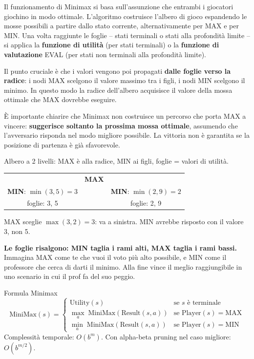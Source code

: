 \documentclass[12pt,a4paper]{article}
\begin{document}
Il funzionamento di Minimax si basa sull'assunzione che entrambi i giocatori giochino in modo ottimale. L'algoritmo costruisce l'albero di gioco espandendo le mosse possibili a partire dallo stato corrente, alternativamente per MAX e per MIN. Una volta raggiunte le foglie -- stati terminali o stati alla profondità limite -- si applica la \textbf{funzione di utilità} (per stati terminali) o la \textbf{funzione di valutazione} EVAL (per stati non terminali alla profondità limite).

Il punto cruciale è che i valori vengono poi propagati \textbf{dalle foglie verso la radice}: i nodi MAX scelgono il valore massimo tra i figli, i nodi MIN scelgono il minimo. In questo modo la radice dell'albero acquisisce il valore della mossa ottimale che MAX dovrebbe eseguire.

È importante chiarire che Minimax non costruisce un percorso che porta MAX a vincere: \textbf{suggerisce soltanto la prossima mossa ottimale}, assumendo che l'avversario risponda nel modo migliore possibile. La vittoria non è garantita se la posizione di partenza è già sfavorevole.

\begin{esempiobox}
Albero a 2 livelli: MAX è alla radice, MIN ai figli, foglie = valori di utilità.
\begin{center}
\renewcommand{\arraystretch}{1.1}
\begin{tabular}{ccc}
& \textbf{MAX} & \\
\textbf{MIN}: $\min(3,5)=3$ & & \textbf{MIN}: $\min(2,9)=2$ \\
foglie: 3, 5 & & foglie: 2, 9
\end{tabular}
\end{center}
MAX sceglie $\max(3,2)=3$: va a sinistra. MIN avrebbe risposto con il valore 3, non 5.
\end{esempiobox}

\begin{ricordabox}
\textbf{Le foglie risalgono: MIN taglia i rami alti, MAX taglia i rami bassi.} Immagina MAX come te che vuoi il voto più alto possibile, e MIN come il professore che cerca di darti il minimo. Alla fine vince il meglio raggiungibile in uno scenario in cui il prof fa del suo peggio.
\end{ricordabox}

\begin{formulabox}{Formula Minimax}
\[
\text{MiniMax}(s) =
\begin{cases}
\text{Utility}(s) & \text{se } s \text{ è terminale} \\[4pt]
\displaystyle\max_{a} \;\text{MiniMax}(\text{Result}(s,a)) & \text{se Player}(s) = \text{MAX} \\[8pt]
\displaystyle\min_{a} \;\text{MiniMax}(\text{Result}(s,a)) & \text{se Player}(s) = \text{MIN}
\end{cases}
\]
Complessità temporale: $O(b^m)$. Con alpha-beta pruning nel caso migliore: $O(b^{m/2})$.
\end{formulabox}
\end{document}
